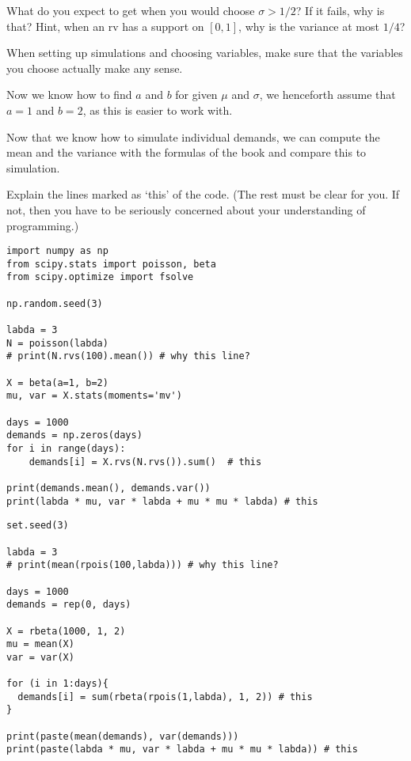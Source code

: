 \begin{exercise}
What do you expect to get when you would choose $\sigma > 1/2$? If it fails, why is that? Hint, when an rv has a support on $[0,1]$, why is the variance at most $1/4$?
\end{exercise}

\begin{remark}
When setting up simulations and choosing variables, make sure that the variables you choose actually make any sense.
\end{remark}

Now we know how to find $a$ and $b$ for given $\mu$ and $\sigma$, we henceforth assume that $a=1$ and $b=2$, as this is easier to work with.

\begin{exercise}
Now that we know how to simulate individual demands, we can compute the mean and the variance with the formulas of the book and compare this to simulation.

Explain the lines marked as `this' of the code. (The rest must be clear for you. If not, then you have to be seriously concerned about your understanding of programming.)

\begin{verbatim}
import numpy as np
from scipy.stats import poisson, beta
from scipy.optimize import fsolve

np.random.seed(3)

labda = 3
N = poisson(labda)
# print(N.rvs(100).mean()) # why this line?

X = beta(a=1, b=2)
mu, var = X.stats(moments='mv')

days = 1000
demands = np.zeros(days)
for i in range(days):
    demands[i] = X.rvs(N.rvs()).sum()  # this

print(demands.mean(), demands.var())
print(labda * mu, var * labda + mu * mu * labda) # this
\end{verbatim}

\begin{verbatim}
set.seed(3)

labda = 3
# print(mean(rpois(100,labda))) # why this line?

days = 1000
demands = rep(0, days)

X = rbeta(1000, 1, 2)
mu = mean(X)
var = var(X)

for (i in 1:days){
  demands[i] = sum(rbeta(rpois(1,labda), 1, 2)) # this
}

print(paste(mean(demands), var(demands)))
print(paste(labda * mu, var * labda + mu * mu * labda)) # this
\end{verbatim}
\end{exercise}

